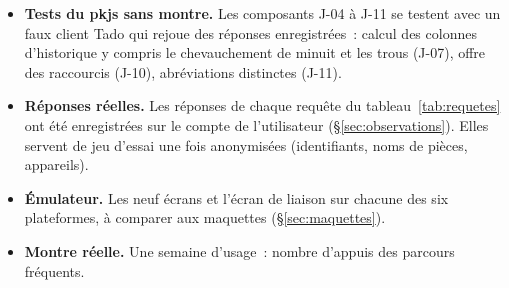 \begin{itemize}
  \item \textbf{Tests du pkjs sans montre.} Les composants J-04 à J-11 se testent avec un faux client
        Tado qui rejoue des réponses enregistrées~: calcul des
        colonnes d'historique y compris le chevauchement de minuit et les trous (J-07),
        offre des raccourcis (J-10), abréviations distinctes (J-11).
  \item \textbf{Réponses réelles.} Les réponses de chaque requête du tableau~\ref{tab:requetes} ont été
        enregistrées sur le compte de l'utilisateur (§\ref{sec:observations}). Elles servent de jeu d'essai une fois
        anonymisées (identifiants, noms de pièces, appareils).
  \item \textbf{Émulateur.} Les neuf écrans et l'écran de liaison sur chacune des six plateformes,
        à comparer aux maquettes (§\ref{sec:maquettes}).
  \item \textbf{Montre réelle.} Une semaine d'usage~: nombre d'appuis des parcours fréquents.
\end{itemize}
